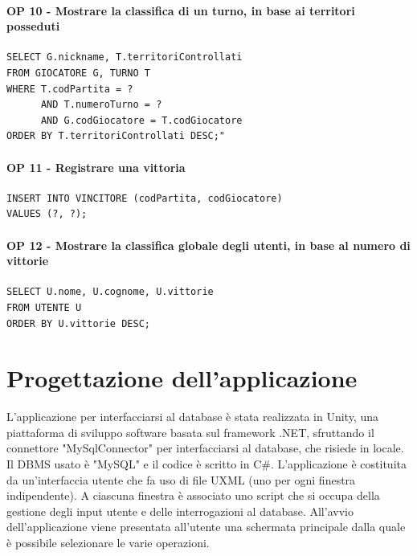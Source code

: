 \documentclass[a4paper,12pt]{report}
\begin{document}
\subsubsection{OP 10 - Mostrare la classifica di un turno, in base ai territori posseduti}

\begin{verbatim}
SELECT G.nickname, T.territoriControllati
FROM GIOCATORE G, TURNO T
WHERE T.codPartita = ?
      AND T.numeroTurno = ?
      AND G.codGiocatore = T.codGiocatore
ORDER BY T.territoriControllati DESC;"
\end{verbatim}

\subsubsection{OP 11 - Registrare una vittoria}

\begin{verbatim}
INSERT INTO VINCITORE (codPartita, codGiocatore) 
VALUES (?, ?);
\end{verbatim}

\subsubsection{OP 12 - Mostrare la classifica globale degli utenti, in base al numero di vittorie}

\begin{verbatim}
SELECT U.nome, U.cognome, U.vittorie 
FROM UTENTE U
ORDER BY U.vittorie DESC;
\end{verbatim}

\chapter{Progettazione dell'applicazione}

L'applicazione per interfacciarsi al database è stata realizzata in Unity, una piattaforma di sviluppo software basata sul framework .NET, sfruttando il connettore "MySqlConnector" per interfacciarsi al database, che risiede in locale. Il DBMS usato è "MySQL" e il codice è scritto in C\#.
L'applicazione è costituita da un'interfaccia utente che fa uso di file UXML (uno per ogni finestra indipendente). A ciascuna finestra è associato uno script che si occupa della gestione degli input utente e delle interrogazioni al database.
All'avvio dell'applicazione viene presentata all'utente una schermata principale dalla quale 
è possibile selezionare le varie operazioni. 
\end{document}
